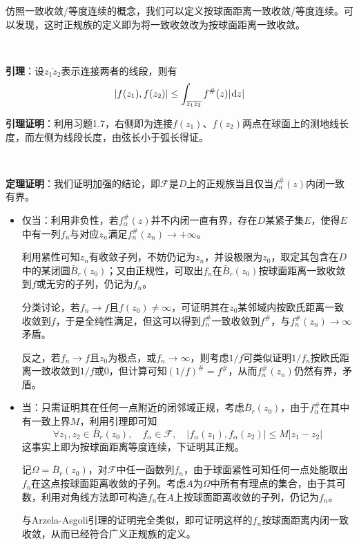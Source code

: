 \documentclass[a4paper,UTF8,fontset=windows,10pt]{ctexart}
\newcommand*{\dr}{\hspace{0.07em}\mathrm{d}}
\begin{document}
\begin{enumerate}
    仿照一致收敛/等度连续的概念，我们可以定义按球面距离一致收敛/等度连续。可以发现，这时正规族的定义即为将一致收敛改为按球面距离一致收敛。

    \

    \textbf{引理}：设$\overline{z_1z_2}$表示连接两者的线段，则有
    $$|f(z_1),f(z_2)|\le\int_{\overline{z_1z_2}}f^\#(z)|\dr z|$$

    \textbf{引理证明}：利用习题1.7，右侧即为连接$f(z_1)$、$f(z_2)$两点在球面上的测地线长度，而左侧为线段长度，由弦长小于弧长得证。

    \

    \textbf{定理证明}：我们证明加强的结论，即$\mathcal{F}$是$D$上的正规族当且仅当$f_\alpha^\#(z)$内闭一致有界。
    \begin{itemize}
        \item 仅当：利用非负性，若$f_\alpha^\#(z)$并不内闭一直有界，存在$D$某紧子集$E$，使得$E$中有一列$f_n$与对应$z_n$满足$f_n^\#(z_n)\to+\infty$。
        
        利用紧性可知$z_n$有收敛子列，不妨仍记为$z_n$，并设极限为$z_0$，取定其包含在$D$中的某闭圆$\bar{B}_r(z_0)$；又由正规性，可取出$f_n$在$\bar{B}_r(z_0)$按球面距离一致收敛到$f$或无穷的子列，仍记为$f_n$。

        分类讨论，若$f_n\to f$且$f(z_0)\ne\infty$，可证明其在$z_0$某邻域内按欧氏距离一致收敛到$f$，于是全纯性满足，但这可以得到$f_n^\#$一致收敛到$f^\#$，与$f_n^\#(z_n)\to\infty$矛盾。

        反之，若$f_n\to f$且$z_0$为极点，或$f_n\to\infty$，则考虑$1/f$可类似证明$1/f_n$按欧氏距离一致收敛到$1/f$或0，但计算可知$(1/f)^\#=f^\#$，从而$f_n^\#(z_n)$仍然有界，矛盾。

        \item 当：只需证明其在任何一点附近的闭邻域正规，考虑$\bar{B}_r(z_0)$，由于$f_\alpha^\#$在其中有一致上界$M$，利用引理即可知
        $$\forall z_1,z_2\in\bar{B}_r(z_0),\quad f_\alpha\in\mathcal{F},\quad |f_\alpha(z_1),f_\alpha(z_2)|\le M|z_1-z_2|$$
        这事实上即为按球面距离等度连续，下证明其正规。

        记$\Omega=\bar{B}_r(z_0)$，对$\mathcal{F}$中任一函数列$f_n$，由于球面紧性可知任何一点处能取出$f_n$在这点按球面距离收敛的子列。考虑$A$为$\Omega$中所有有理点的集合，由于其可数，利用对角线方法即可构造$f_n$在$A$上按球面距离收敛的子列，仍记为$f_n$。

        与Arzela-Asgoli引理的证明完全类似，即可证明这样的$f_n$按球面距离内闭一致收敛，从而已经符合广义正规族的定义。
    \end{itemize}


\end{enumerate}
\end{document}
